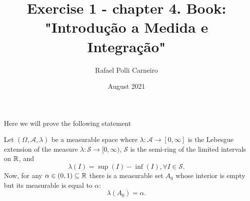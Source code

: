 \documentclass[11pt,a4paper]{article}
\title{Exercise 1 - chapter 4. Book: "Introdução a Medida e Integração"}
\author{Rafael Polli Carneiro}
\date{August 2021}
\begin{document}
\maketitle
\tableofcontents

Here we will prove the following statement
\begin{proposition}
    Let $(\Omega, \mathcal{A}, \lambda)$  be a measurable space where 
    $\lambda: \mathcal{A} \to [0,\infty]$  is the Lebesgue extension of the
    measure $\lambda: \mathcal{S} \to [0,\infty)$,
    $\mathcal{S}$ is the semi-ring of the limited intervals on $\operatorname{\mathbb{R}}$, and
    \begin{equation*}
        \lambda(I) = \sup(I) - \inf(I), \forall I \in \mathcal{S}.
    \end{equation*}
    Now, for any $\alpha \in (0,1) \subseteq \operatorname{\mathbb{R}}$ there is a measurable set
    $A_0$ whose interior is empty but its measurable is equal to $\alpha$:
    \begin{equation}
        \lambda(A_0) = \alpha.
    \end{equation}
\end{proposition}
\end{document}

